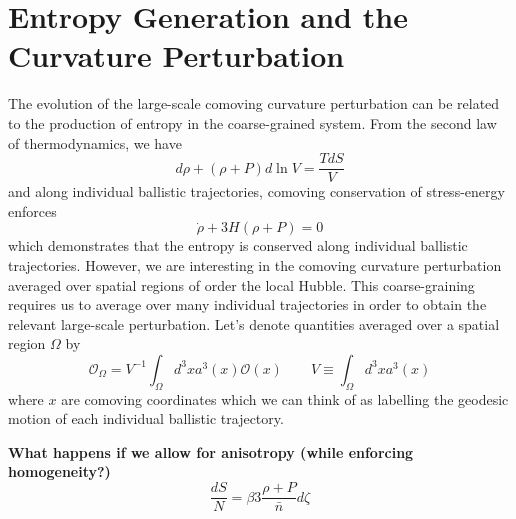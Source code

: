 \documentclass[11pt,a4paper]{article}
\begin{document}


\section{Entropy Generation and the Curvature Perturbation}
The evolution of the large-scale comoving curvature perturbation can be related to the production of entropy in the coarse-grained system.
From the second law of thermodynamics, we have
\begin{equation}
  d\rho + (\rho+P)d\ln V = \frac{TdS}{V}
\end{equation}
and along individual ballistic trajectories, comoving conservation of stress-energy enforces
\begin{equation}
  \dot{\rho} + 3H(\rho+P) = 0
\end{equation}
which demonstrates that the entropy is conserved along individual ballistic trajectories.
However, we are interesting in the comoving curvature perturbation averaged over spatial regions of order the local Hubble.
This coarse-graining requires us to average over many individual trajectories in order to obtain the relevant large-scale perturbation.
Let's denote quantities averaged over a spatial region $\Omega$ by
\begin{equation}
  \mathcal{O}_\Omega = V^{-1}\int_\Omega d^3x a^3(x)\mathcal{O}(x) \qquad V \equiv \int_\Omega d^3x a^3(x)
\end{equation}
where $x$ are comoving coordinates which we can think of as labelling the geodesic motion of each individual ballistic trajectory.

{\bf What happens if we allow for anisotropy (while enforcing homogeneity?)}
\begin{equation}
  \frac{dS}{N} = \beta3\frac{\rho + P}{\bar{n}} d\zeta
\end{equation}
\end{document}
